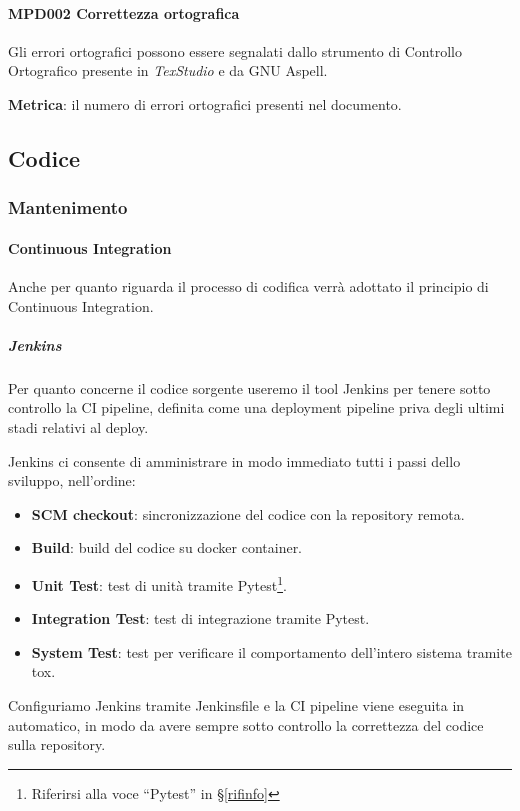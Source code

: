 			\paragraph{MPD002 Correttezza ortografica}
			Gli errori ortografici possono essere segnalati dallo strumento di Controllo Ortografico presente in \textit{TexStudio} e da GNU Aspell.

			\textbf{Metrica}: il numero di errori ortografici presenti nel documento.
			
	\subsection{Codice}\label{PS:Codice}
	
	    \subsubsection{Mantenimento}\label{MantenimentoCodice}
	    
		\paragraph{Continuous Integration}\label{CI}
		Anche per quanto riguarda il processo di codifica verrà adottato il principio di Continuous Integration.

			\subparagraph{Jenkins}\label{Jenkins}
			Per quanto concerne il codice sorgente useremo il tool Jenkins per tenere sotto controllo la CI pipeline, definita come una deployment pipeline priva degli ultimi stadi relativi al deploy.\par
			Jenkins ci consente di amministrare in modo immediato tutti i passi dello sviluppo, nell'ordine:
			\begin{itemize}
				\item \textbf{SCM checkout}: sincronizzazione del codice con la repository remota.
				\item \textbf{Build}: build del codice su docker container.
				\item \textbf{Unit Test}: test di unità tramite Pytest\footnote{Riferirsi alla voce ``Pytest'' in \S\ref{rifinfo}}.
				\item \textbf{Integration Test}: test di integrazione tramite Pytest.
				\item \textbf{System Test}: test per verificare il comportamento dell'intero sistema tramite tox.
			\end{itemize}

			Configuriamo Jenkins tramite Jenkinsfile e la CI pipeline viene eseguita in automatico, in modo da avere sempre sotto controllo la correttezza del codice sulla repository.

